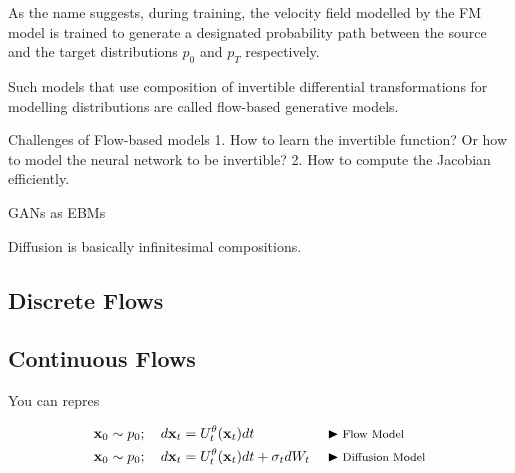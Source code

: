 \documentclass[a4paper, 11pt]{article}
\begin{document}
As the name suggests, during training, the velocity field modelled by the FM model is trained to generate a designated probability path between the source and the target distributions $p_0$ and $p_T$ respectively.


Such models that use composition of invertible differential transformations for modelling distributions are called flow-based generative models.

Challenges of Flow-based models 1. How to learn the invertible function? Or how to model the neural network to be invertible? 2. How to compute the Jacobian efficiently.


GANs as EBMs

\begin{center} 
\end{center} 


Diffusion is basically infinitesimal compositions.

\subsection{Discrete Flows}

\subsection{Continuous Flows}

You can repres

\begin{align}
    \mbox{$\mbox{$\mathbf{x}$}$}_0 \sim p_0; \quad d\mbox{$\mbox{$\mathbf{x}$}$}_t &= U_t^{\theta}(\mbox{$\mbox{$\mathbf{x}$}$}_t) dt &&\blacktriangleright\text{\footnotesize Flow Model} \\
    \mbox{$\mbox{$\mathbf{x}$}$}_0 \sim p_0; \quad d\mbox{$\mbox{$\mathbf{x}$}$}_t &= U_t^{\theta}(\mbox{$\mbox{$\mathbf{x}$}$}_t) dt + \sigma_t dW_t && \blacktriangleright\text{\footnotesize Diffusion Model}
\end{align}
\end{document}
